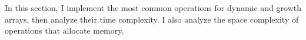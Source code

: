 In this section, I implement the most common operations for dynamic and growth arrays, then analyze their time complexity. I also analyze the space complexity of operations that allocate memory.